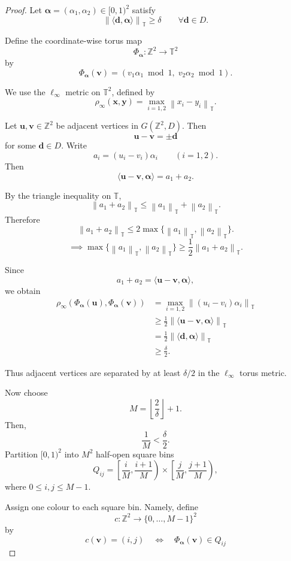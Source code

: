 \documentclass[11pt,fleqn]{article}
\newcommand{\Z}{\mathbb{Z}}
\newcommand{\T}{\mathbb{T}}
\newcommand{\norm}[1]{\left\|#1\right\|}
\newcommand{\floor}[1]{\left\lfloor#1\right\rfloor}
\begin{document}
\begin{proof}
Let $\boldsymbol\alpha=(\alpha_1,\alpha_2)\in [0,1)^2$ satisfy
\[
\norm{\langle \mathbf d,\boldsymbol\alpha\rangle}_{\T}\ge \delta
\qquad
\forall \mathbf d\in D.
\]

Define the coordinate-wise torus map
\[
\Phi_{\boldsymbol\alpha}:\Z^2\to \T^2
\]
by
\begin{equation}
\Phi_{\boldsymbol\alpha}(\mathbf v)
=
(v_1\alpha_1 \bmod 1,\; v_2\alpha_2 \bmod 1).
\end{equation}

We use the $\ell_\infty$ metric on $\T^2$, defined by
\[
\rho_\infty(\mathbf x,\mathbf y)
=
\max_{i=1,2}\norm{x_i-y_i}_{\T}.
\]

Let $\mathbf u,\mathbf v\in \Z^2$ be adjacent vertices in $G(\Z^2,D)$. Then
\[
\mathbf u-\mathbf v=\pm \mathbf d
\]
for some $\mathbf d\in D$. Write
\[
a_i=(u_i-v_i)\alpha_i
\qquad
(i=1,2).
\]
Then
\[
\langle \mathbf u-\mathbf v,\boldsymbol\alpha\rangle
=
a_1+a_2.
\]

By the triangle inequality on $\T$,
\[
\norm{a_1+a_2}_{\T}
\le
\norm{a_1}_{\T}+\norm{a_2}_{\T}.
\]
Therefore
\[
\norm{a_1+a_2}_{\T}
\le
2\max\{\norm{a_1}_{\T},\norm{a_2}_{\T}\}.
\]
\begin{equation}
\implies \max\{\norm{a_1}_{\T},\norm{a_2}_{\T}\}
\ge
\frac12\norm{a_1+a_2}_{\T}.
\end{equation}

Since
\[
a_1+a_2
=
\langle \mathbf u-\mathbf v,\boldsymbol\alpha\rangle,
\]
we obtain
\begin{align}
\rho_\infty\!\left(
\Phi_{\boldsymbol\alpha}(\mathbf u),
\Phi_{\boldsymbol\alpha}(\mathbf v)
\right)
&=
\max_{i=1,2}\norm{(u_i-v_i)\alpha_i}_{\T} \\
&\ge
\frac12
\norm{\langle \mathbf u-\mathbf v,\boldsymbol\alpha\rangle}_{\T} \\
&=
\frac12
\norm{\langle \mathbf d,\boldsymbol\alpha\rangle}_{\T} \\
&\ge
\frac{\delta}{2}.
\end{align}

Thus adjacent vertices are separated by at least $\delta/2$ in the $\ell_\infty$ torus metric.

Now choose
\[
M=\floor{\frac{2}{\delta}}+1.
\]
Then,
\[
\frac1M<\frac{\delta}{2}.
\]
Partition $[0,1)^2$ into $M^2$ half-open square bins
\[
Q_{ij}
=
\left[\frac{i}{M},\frac{i+1}{M}\right)
\times
\left[\frac{j}{M},\frac{j+1}{M}\right),
\]
where $0\le i,j\le M-1$.

Assign one colour to each square bin. Namely, define
\[
c:\Z^2\to \{0,\dots,M-1\}^2
\]
by
\[
c(\mathbf v)=(i,j)
\quad\Longleftrightarrow\quad
\Phi_{\boldsymbol\alpha}(\mathbf v)\in Q_{ij}
\]


\end{proof}
\end{document}

